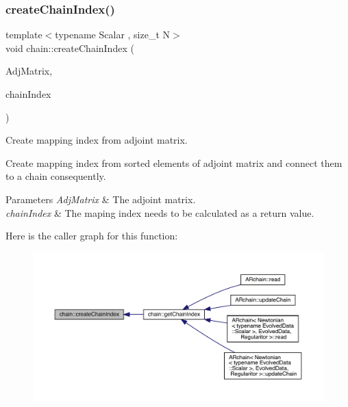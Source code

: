 \subsubsection{\texorpdfstring{create\+Chain\+Index()}{createChainIndex()}}
{\footnotesize\ttfamily template$<$typename Scalar , size\+\_\+t N$>$ \\
void chain\+::create\+Chain\+Index (\begin{DoxyParamCaption}\item[{\mbox{\hyperlink{namespacechain_a3a021b84403e03113e1dcd61ba304963}{Node\+Array}}$<$ Scalar, N $\ast$(N -\/ 1)/2 $>$ \&}]{Adj\+Matrix,  }\item[{\mbox{\hyperlink{namespacechain_aa40d2da395c0ac2bc5f37832442ac403}{Index\+Array}}$<$ N $>$ \&}]{chain\+Index }\end{DoxyParamCaption})}



Create mapping index from adjoint matrix. 

Create mapping index from sorted elements of adjoint matrix and connect them to a chain consequently. 
\begin{DoxyParams}{Parameters}
{\em Adj\+Matrix} & The adjoint matrix. \\
\hline
{\em chain\+Index} & The maping index needs to be calculated as a return value. \\
\hline
\end{DoxyParams}
Here is the caller graph for this function\+:
\nopagebreak
\begin{figure}[H]
\begin{center}
\leavevmode
\includegraphics[width=350pt]{namespacechain_ae008a8273beabf1473c347994197ef53_icgraph}
\end{center}
\end{figure}
\mbox{\label{namespacechain_a3e7b0a001442f121ce1408e7c9d12016}} 
